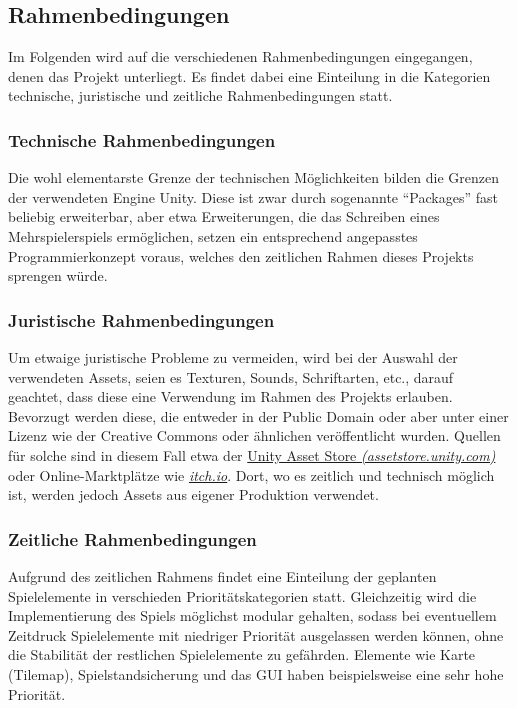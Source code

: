 \documentclass[paper=A4,pagesize=auto,12pt,headinclude=true,footinclude=true,BCOR=0mm,DIV=calc]{scrartcl}
\newcommand{\sectionspace}{
	\vspace{0.5cm}
}
\begin{document}
\sectionspace
\subsection{Rahmenbedingungen}\label{sec:Rahmenbedingungen}
Im Folgenden wird auf die verschiedenen Rahmenbedingungen eingegangen, denen das Projekt unterliegt. Es findet dabei eine Einteilung in die Kategorien technische, juristische und zeitliche Rahmenbedingungen statt. %

\subsubsection{Technische Rahmenbedingungen}
Die wohl elementarste Grenze der technischen Möglichkeiten bilden die Grenzen der verwendeten Engine Unity.  Diese ist zwar durch sogenannte "`Packages"' fast beliebig erweiterbar, aber etwa Erweiterungen, die das Schreiben eines Mehrspielerspiels ermöglichen, setzen ein entsprechend angepasstes Programmierkonzept voraus, welches den zeitlichen Rahmen dieses Projekts sprengen würde.

\subsubsection{Juristische Rahmenbedingungen}
Um etwaige juristische Probleme zu vermeiden, wird bei der Auswahl der verwendeten Assets, seien es Texturen, Sounds, Schriftarten, etc., darauf geachtet, dass diese eine Verwendung im Rahmen des Projekts erlauben. Bevorzugt werden diese, die entweder in der Public Domain oder aber unter einer Lizenz wie der Creative Commons \cite{cc_licenses} oder ähnlichen veröffentlicht wurden. Quellen für solche sind in diesem Fall etwa der \hyperref{https://assetstore.unity.com/}{}{}{Unity Asset Store \textit{(assetstore.unity.com)}} oder Online-Marktplätze wie \hyperref{https://itch.io/}{}{}{\textit{itch.io}}. Dort, wo es zeitlich und technisch möglich ist, werden jedoch Assets aus eigener Produktion verwendet.

\subsubsection{Zeitliche Rahmenbedingungen}
Aufgrund des zeitlichen Rahmens findet eine Einteilung der geplanten Spielelemente in verschieden Prioritätskategorien statt. Gleichzeitig wird die Implementierung des Spiels möglichst modular gehalten, sodass bei eventuellem Zeitdruck Spielelemente mit niedriger Priorität ausgelassen werden können, ohne die Stabilität der restlichen Spielelemente zu gefährden. Elemente wie Karte (Tilemap), Spielstandsicherung und das GUI haben beispielsweise eine sehr hohe Priorität.
\end{document}
